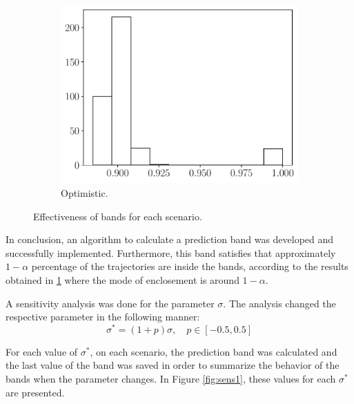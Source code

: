 \documentclass[11pt]{article}
\theoremstyle{definition}
\theoremstyle{remark}
\theoremstyle{remark}
\begin{document}
\begin{figure}[H]
\begin{subfigure}[b]{0.45\textwidth}
      \includegraphics[scale=0.45]{eff_opti.pdf}
      \caption{Optimistic.}
  \end{subfigure}
  \caption{Effectiveness of bands for each scenario.}
  \label{fig:eff1}
\end{figure}

In conclusion, an algorithm to calculate a prediction band was
developed and successfully implemented. Furthermore, this band satisfies that
approximately $1 - \alpha$ percentage of the
trajectories are inside the bands, according to the results obtained in
\ref{fig:eff1} where the mode of enclosement is around $1 - \alpha$.

A sensitivity analysis was done for the parameter $\sigma$. The
analysis changed the respective parameter in the following manner:
\begin{equation*}
  \sigma^* = (1 + p)\sigma, \quad p \in [-0.5, 0.5]
\end{equation*}

For each value of $\sigma^*$, on each scenario, the prediction band
was calculated and the last value of the band was saved in order to summarize
the behavior of the bands when the parameter changes. In Figure
\ref{fig:sens1}, these values for each $\sigma^*$ are presented.
\end{document}

